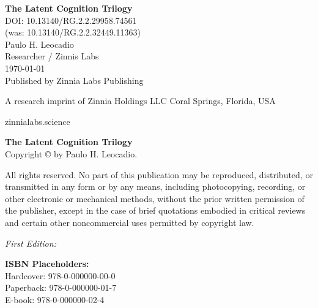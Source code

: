 \begin{titlepage}
    \centering
    \vspace*{1.9in} %
    
    {\Huge \textbf{The Latent Cognition Trilogy}}\\[0.5in] %
    {\Large DOI: 10.13140/RG.2.2.29958.74561 \\
(was: 10.13140/RG.2.2.32449.11363)}\\[1.5in]
    
    {\Large Paulo H. Leocadio}\\[0.2in]
    {\large Researcher / Zinnis Labs}\\[1.5in]
    
    {\large \today}\\[1.5in] %
    \vspace*{2in}
    {\large Published by}
    Zinnia Labs Publishing

A research imprint of Zinnia Holdings LLC
Coral Springs, Florida, USA

zinnialabs.science
    \thispagestyle{empty}
\end{titlepage}
\newpage

\thispagestyle{empty}
\null
\vfill

\noindent \textbf{The Latent Cognition Trilogy} \\
Copyright \copyright{} \the\year{} by Paulo H. Leocadio. 

\vspace{0.2in}
\noindent All rights reserved. No part of this publication may be reproduced, distributed, or transmitted in any form or by any means, including photocopying, recording, or other electronic or mechanical methods, without the prior written permission of the publisher, except in the case of brief quotations embodied in critical reviews and certain other noncommercial uses permitted by copyright law.

\vspace{0.2in}
\noindent \textit{First Edition: \the\year{}}

\vspace{0.2in}
\noindent \textbf{ISBN Placeholders:} \\
Hardcover: 978-0-000000-00-0 \\
Paperback: 978-0-000000-01-7 \\
E-book: 978-0-000000-02-4 

